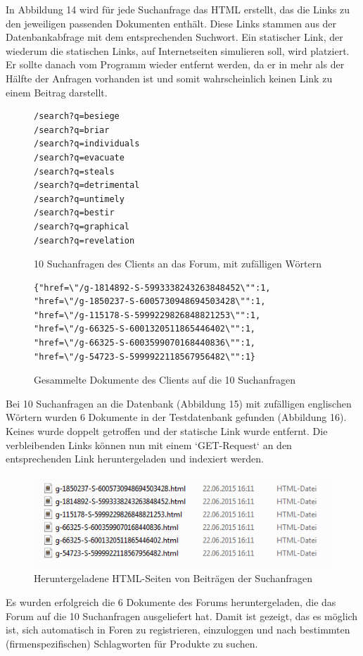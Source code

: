 In Abbildung 14 wird für jede Suchanfrage das HTML erstellt, das die Links zu den jeweiligen passenden Dokumenten enthält. Diese Links stammen aus der Datenbankabfrage mit dem entsprechenden Suchwort.
Ein statischer Link, der wiederum die statischen Links, auf Internetseiten simulieren soll, wird platziert. Er sollte danach vom Programm wieder entfernt werden, da er in mehr als der Hälfte der Anfragen vorhanden ist und somit wahrscheinlich keinen Link zu einem Beitrag darstellt.

\begin{figure}[h!]
\begin{lstlisting}[language=HTML5]
/search?q=besiege
/search?q=briar
/search?q=individuals
/search?q=evacuate
/search?q=steals
/search?q=detrimental
/search?q=untimely
/search?q=bestir
/search?q=graphical
/search?q=revelation
\end{lstlisting}
\caption{10 Suchanfragen des Clients an das Forum, mit zufälligen Wörtern}
\end{figure}

\begin{figure}[h!]
\begin{lstlisting}[language=HTML5]
{"href=\"/g-1814892-S-5993338243263848452\"":1,
"href=\"/g-1850237-S-6005730948694503428\"":1,
"href=\"/g-115178-S-5999229826848821253\"":1,
"href=\"/g-66325-S-6001320511865446402\"":1,
"href=\"/g-66325-S-6003599070168440836\"":1,
"href=\"/g-54723-S-5999922118567956482\"":1}
\end{lstlisting}
\caption{Gesammelte Dokumente des Clients auf die 10 Suchanfragen}
\end{figure}

Bei 10 Suchanfragen an die Datenbank (Abbildung 15) mit zufälligen englischen Wörtern wurden 6 Dokumente in der Testdatenbank gefunden (Abbildung 16). Keines wurde doppelt getroffen und der statische Link wurde entfernt. Die verbleibenden Links können nun mit einem `GET-Request` an den entsprechenden Link heruntergeladen und indexiert werden.
\newpage

\begin{figure}[h!]
\includegraphics{./images/postdownload.png}
\caption{Heruntergeladene HTML-Seiten von Beiträgen der Suchanfragen}
\end{figure}


Es wurden erfolgreich die 6 Dokumente des Forums heruntergeladen, die das Forum auf die 10 Suchanfragen ausgeliefert hat.
Damit ist gezeigt, das es möglich ist, sich automatisch in Foren zu registrieren, einzuloggen und nach bestimmten (firmenspezifischen) Schlagworten für Produkte zu suchen.
\newpage

